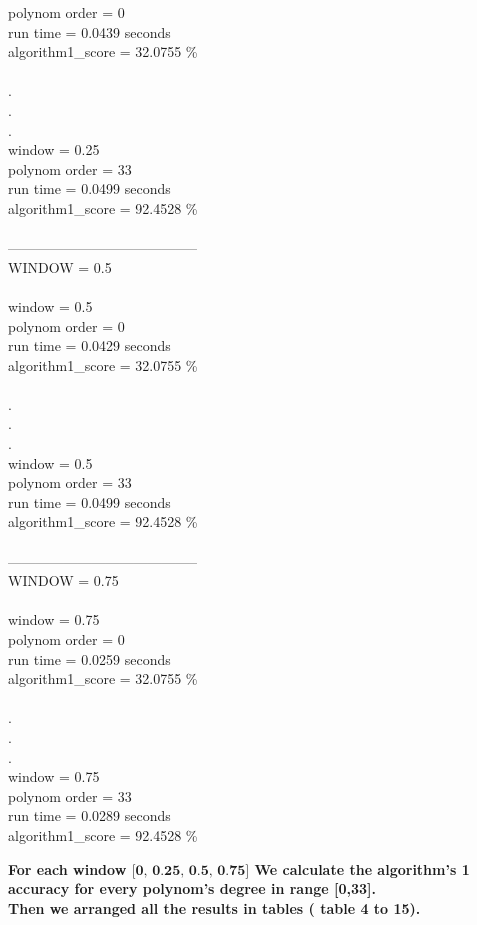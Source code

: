 \documentclass{article}
\begin{document}
\begin{multicols}{2}
polynom order = 0\\
run time = 0.0439 seconds\\
algorithm1\_score = 32.0755 \%\\
\\
.\\
.\\
.\\
window = 0.25\\
polynom order = 33\\
run time = 0.0499 seconds\\
algorithm1\_score = 92.4528 \%\\
\\
-----------------------------------------\\
WINDOW = 0.5 \\\\
window = 0.5\\
polynom order = 0\\
run time = 0.0429 seconds\\
algorithm1\_score = 32.0755 \%\\
\\
.\\
.\\
.\\
window = 0.5\\
polynom order = 33\\
run time = 0.0499 seconds\\
algorithm1\_score = 92.4528 \%\\
\\
-----------------------------------------\\
WINDOW = 0.75 \\\\
window = 0.75\\
polynom order = 0\\
run time = 0.0259 seconds\\
algorithm1\_score = 32.0755 \%\\
\\
.\\
.\\
.\\
window = 0.75\\
polynom order = 33\\
run time = 0.0289 seconds\\
algorithm1\_score = 92.4528 \%\\
\end{multicols}

\textbf{For each window \(\textbf{[0, 0.25, 0.5, 0.75]}\) We calculate the algorithm's 1 accuracy for every polynom's degree in range [0,33]. \\ 
Then we arranged all the results in tables ( table 4 to 15).} \\
\end{document}

